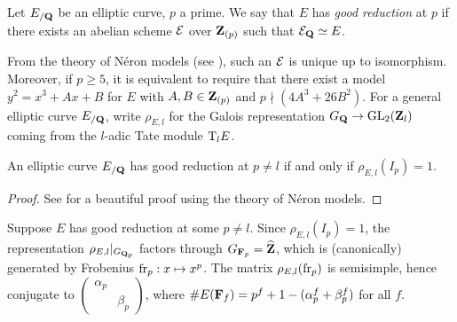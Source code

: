 \begin{definition}
Let $E_{/\mathbf{Q}}$ be an elliptic curve, $p$ a prime. We say that $E$ has 
\emph{good reduction} at $p$ if there exists an abelian scheme 
$\mathcal{E}$ over $\mathbf{Z}_{(p)}$ such that $\mathcal{E}_{\mathbf{Q}}\simeq E$. 
\end{definition}

From the theory of N\'eron models (see \cite{bosch-lutkebohmert-raynaud-1990}), 
such an $\mathcal{E}$ is unique up to isomorphism. 
Moreover, if $p\geqslant 5$, it is equivalent to require that there exist a 
model $y^2=x^3+A x+B$ for $E$ with $A,B\in \mathbf{Z}_{(p)}$ and 
$p\nmid (4 A^3+26 B^2)$. For a general elliptic curve $E_{/\mathbf{Q}}$, write 
$\rho_{E,l}$ for the Galois representation $G_{\mathbf{Q}}\to \operatorname{GL}_2(\mathbf{Z}_l)$ coming from 
the $l$-adic Tate module $\mathrm{T}_l E$. 

\begin{theorem}\label{thm:neron-ogg}
An elliptic curve $E_{/\mathbf{Q}}$ has good reduction at $p\ne l$ if and only if 
$\rho_{E,l}(I_p) = 1$. 
\end{theorem}
\begin{proof}
See \cite{serre-tate-1968} for a beautiful proof using the theory of N\'eron 
models. 
\end{proof}

Suppose $E$ has good reduction at some $p\ne l$. Since $\rho_{E,l}(I_p)=1$, the 
representation $\rho_{E,l}|_{G_{\mathbf{Q}_p}}$ factors 
through $G_{\mathbf{F}_p} = \widehat{\mathbf{Z}}$, which is (canonically) generated by Frobenius 
$\mathrm{fr}_p:x\mapsto x^p$. The matrix $\rho_{E,l}(\mathrm{fr}_p)$ is 
semisimple, hence conjugate to 
$\begin{pmatrix} \alpha_p \\ & \beta_p \end{pmatrix}$, 
where $\# E(\mathbf{F}_f) = p^f+1-(\alpha_p^f + \beta_p^f)$ for all $f$. 

